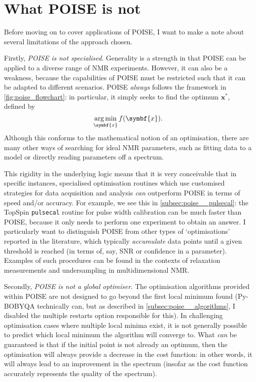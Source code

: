 \section{What POISE is not}
\label{sec:poise__notpoise}

Before moving on to cover applications of POISE, I want to make a note about several limitations of the approach chosen. 

Firstly, \textit{POISE is not specialised}.
Generality is a strength in that POISE can be applied to a diverse range of NMR experiments.
However, it can also be a weakness, because the capabilities of POISE must be restricted such that it can be adapted to different scenarios.
POISE \textit{always} follows the framework in \cref{fig:poise_flowchart}: in particular, it simply seeks to find the optimum $\symbf{x}^*$, defined by
\begin{equation}
    \label{eq:poise_argmin}
    \argmin_{\symbf{x}} f(\symbf{x}).
\end{equation}
Although this conforms to the mathematical notion of an optimisation, there are many other ways of searching for ideal NMR parameters, such as fitting data to a model or directly reading parameters off a spectrum.

This rigidity in the underlying logic means that it is very conceivable that in specific instances, specialised optimisation routines which use customised strategies for data acquisition and analysis \textit{can} outperform POISE in terms of speed and/or accuracy.
For example, we see this in \cref{subsec:poise__pulsecal}: the TopSpin \texttt{pulsecal} routine for pulse width calibration can be much faster than POISE, because it only needs to perform one experiment to obtain an answer.
I particularly want to distinguish POISE from other types of `optimisations' reported in the literature, which typically \textit{accumulate} data points until a given threshold is reached (in terms of, say, SNR or confidence in a parameter).
Examples of such procedures can be found in the contexts of relaxation measurements\autocite{Song2018JMR,Tang2019SR} and undersampling in multidimensional NMR\autocite{Eghbalnia2005JACS,Hansen2016ACIE,BrukerSmartDriveNMR}.

Secondly, \textit{POISE is not a global optimiser}.
The optimisation algorithms provided within POISE are not designed to go beyond the first local minimum found (Py-BOBYQA technically can, but as described in \cref{subsec:poise__algorithms}, I disabled the multiple restarts option responsible for this).
In challenging optimisation cases where multiple local minima exist, it is not generally possible to predict which local minimum the algorithm will converge to.
What \textit{can} be guaranteed is that if the initial point is not already an optimum, then the optimisation will always provide a decrease in the cost function: in other words, it will always lead to an improvement in the spectrum (insofar as the cost function accurately represents the quality of the spectrum).

